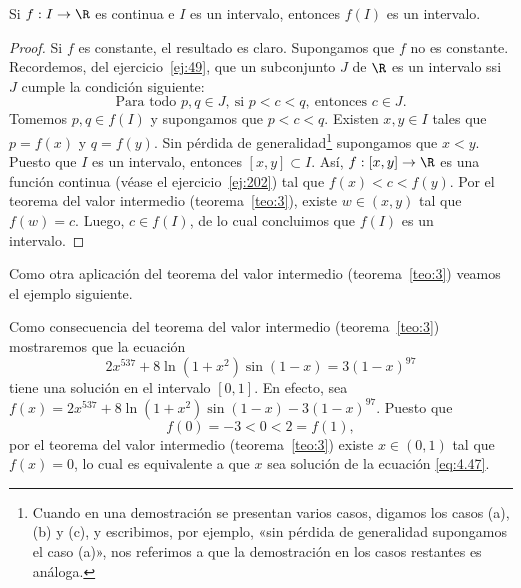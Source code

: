 \documentclass[12pt,a4paper]{book}
\begin{document}
    \begin{teorema}\label{teo:4}
        Si $f:I\to\R$ es continua e $I$ es un intervalo, entonces $f(I)$ es
        un intervalo.
    \end{teorema}

    \begin{proof}
        Si $f$ es constante, el resultado es claro. Supongamos que $f$ no
        es constante. Recordemos, del ejercicio~\ref{ej:49}, que un subconjunto $J$ de $\R$ es un
        intervalo ssi $J$ cumple la condición siguiente:
        \begin{equation*}
            \text{Para todo }p,q\in J,\ \text{si }p<c<q,\ \text{entonces }c\in J.
        \end{equation*}
        Tomemos $p,q\in f(I)$ y supongamos que $p<c<q$. Existen $x,y\in I$
        tales que $p=f(x)$ y $q=f(y)$. Sin pérdida de generalidad\footnote{Cuando en una demostración se presentan varios casos, digamos los casos (a), (b) y
        (c), y escribimos, por ejemplo, «sin pérdida de generalidad supongamos el caso (a)», nos
        referimos a que la demostración en los casos restantes es análoga.}
        supongamos que $x<y$. Puesto que $I$ es un intervalo, entonces $[x,y]\subset I$.
        Así, $f:[x,y]\to\R$ es una función continua (véase el ejercicio~\ref{ej:202}) tal que
        $f(x)<c<f(y)$. Por el teorema del valor intermedio (teorema~\ref{teo:3}), existe
        $w\in(x,y)$ tal que $f(w)=c$. Luego, $c\in f(I)$, de lo cual concluimos que
        $f(I)$ es un intervalo.
    \end{proof}

    Como otra aplicación del teorema del valor intermedio (teorema~\ref{teo:3}) veamos
    el ejemplo siguiente.

    \begin{ejemplo}\label{ejm:69}
        Como consecuencia del teorema
        del valor intermedio (teorema~\ref{teo:3}) mostraremos que la ecuación
        \begin{equation}\label{eq:4.47}
            2x^{537}+8\ln\left(1+x^{2}\right)\sin(1-x)=3(1-x)^{97}
        \end{equation}
        tiene una solución en el intervalo $[0,1]$. En efecto, sea $f(x)=2x^{537}+
        8\ln\left(1+x^{2}\right)\sin(1-x)-3(1-x)^{97}$. Puesto que
        \begin{equation*}
            f(0)=-3<0<2=f(1),
        \end{equation*}
        por el teorema del valor intermedio (teorema~\ref{teo:3}) existe $x\in(0,1)$ tal que
        $f(x)=0$, lo cual es equivalente a que $x$ sea solución de la ecuación \eqref{eq:4.47}.
    \end{ejemplo}
\end{document}
